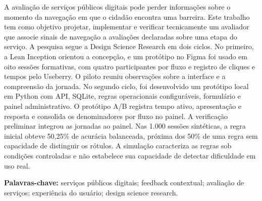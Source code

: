 \begin{resumo}
A avaliação de serviços públicos digitais pode perder informações sobre o momento da navegação em que o cidadão encontra uma barreira. Este trabalho tem como objetivo projetar, implementar e verificar tecnicamente um avaliador que associe sinais de navegação a avaliações declaradas sobre uma etapa do serviço. A pesquisa segue a Design Science Research em dois ciclos. No primeiro, a Lean Inception orientou a concepção, e um protótipo no Figma foi usado em oito sessões formativas, com quatro participantes por fluxo e registro de cliques e tempos pelo Useberry. O piloto reuniu observações sobre a interface e a compreensão da jornada. No segundo ciclo, foi desenvolvido um protótipo local em Python com API, SQLite, regras operacionais configuráveis, formulário e painel administrativo. O protótipo A/B registra tempo ativo, apresentação e resposta e consolida os denominadores por fluxo no painel. A verificação preliminar integrou as jornadas ao painel. Nas 1.000 sessões sintéticas, a regra inicial obteve 50,25\% de acurácia balanceada, próxima dos 50\% de uma regra sem capacidade de distinguir os rótulos. A simulação caracteriza as regras sob condições controladas e não estabelece sua capacidade de detectar dificuldade em uso real.

\vspace{\onelineskip}
\noindent \textbf{Palavras-chave:} serviços públicos digitais; feedback contextual; avaliação de serviços; experiência do usuário; design science research.
\end{resumo}
